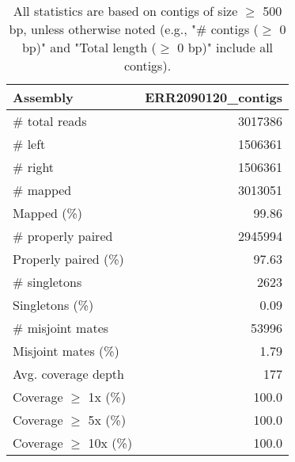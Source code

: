 \documentclass[12pt,a4paper]{article}
\begin{document}
\begin{table}[ht]
\begin{center}
\caption{All statistics are based on contigs of size $\geq$ 500 bp, unless otherwise noted (e.g., "\# contigs ($\geq$ 0 bp)" and "Total length ($\geq$ 0 bp)" include all contigs).}
\begin{tabular}{|l*{1}{|r}|}
\hline
Assembly & ERR2090120\_contigs \\ \hline
\# total reads & 3017386 \\ \hline
\# left & 1506361 \\ \hline
\# right & 1506361 \\ \hline
\# mapped & 3013051 \\ \hline
Mapped (\%) & 99.86 \\ \hline
\# properly paired & 2945994 \\ \hline
Properly paired (\%) & 97.63 \\ \hline
\# singletons & 2623 \\ \hline
Singletons (\%) & 0.09 \\ \hline
\# misjoint mates & 53996 \\ \hline
Misjoint mates (\%) & 1.79 \\ \hline
Avg. coverage depth & 177 \\ \hline
Coverage $\geq$ 1x (\%) & 100.0 \\ \hline
Coverage $\geq$ 5x (\%) & 100.0 \\ \hline
Coverage $\geq$ 10x (\%) & 100.0 \\ \hline
\end{tabular}
\end{center}
\end{table}
\end{document}
